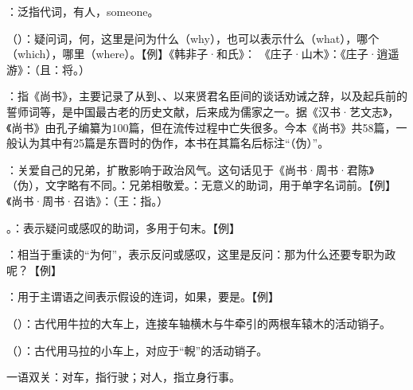 {
\item {}：泛指代词，有人，someone。
\item {}（）：疑问词，何，这里是问为什么（why），也可以表示什么（what），哪个（which），哪里（where）。【例】《韩非子·和氏》：  《庄子·山木》：《庄子·逍遥游》：（且：将。）
\item {}：指《尚书》，主要记录了从到、、以来贤君名臣间的谈话劝诫之辞，以及起兵前的誓师词等，是中国最古老的历史文献，后来成为儒家之一。据《汉书·艺文志》，《尚书》由孔子编纂为100篇，但在流传过程中亡失很多。今本《尚书》共58篇，一般认为其中有25篇是东晋时的伪作，本书在其篇名后标注“（伪）”。
\item {}：关爱自己的兄弟，扩散影响于政治风气。这句话见于《尚书·周书·君陈》（伪），文字略有不同。：兄弟相敬爱。：无意义的助词，用于单字名词前。【例】《尚书·周书·召诰》：（王：指。）
\item {}。：表示疑问或感叹的助词，多用于句末。【例】   

：相当于重读的“为何”，表示反问或感叹，这里是反问：那为什么还要专职为政呢？【例】 
}
{}


{
\item {}：用于主谓语之间表示假设的连词，如果，要是。【例】   
\item {}（）：古代用牛拉的大车上，连接车轴横木与牛牵引的两根车辕木的活动销子。

（）：古代用马拉的小车上，对应于“輗”的活动销子。

\item {}一语双关：对车，指行驶；对人，指立身行事。
}
{}  %


